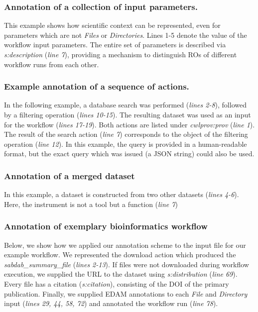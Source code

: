 

\subsubsection{Annotation of a collection of input parameters.} \label{sec:annot_actions}
This example shows how scientific context can be represented, even for parameters which are not \emph{Files} or \emph{Directories}. Lines 1-5 denote the value of the workflow input parameters. The entire set of parameters is described via \emph{s:description} (\emph{line 7}), providing a mechanism to distinguish ROs of different workflow runs from each other.



\subsubsection{Example annotation of a sequence of actions.} 

In the following example, a database search was performed (\emph{lines 2-8}), followed by a filtering operation (\emph{lines 10-15}). The resulting dataset was used as an input for the workflow (\emph{lines 17-19}). Both actions are listed under \emph{cwlprov:prov} (\emph{line 1}). The result of the search action (\emph{line 7}) corresponds to the object of the filtering operation (\emph{line 12}). In this example, the query is provided in a human-readable format, but the exact query which was issued (a JSON string) could also be used.



\subsubsection{Annotation of a merged dataset}

In this example, a dataset is constructed from two other datasets (\emph{lines 4-6}).
Here, the instrument is not a tool but a function (\emph{line 7})



\subsubsection{Annotation of exemplary bioinformatics workflow}
Below, we show how we applied our annotation scheme to the input file for our example workflow. We represented the download action which produced the \emph{sabdab\_summary\_file} (\emph{lines 2-13}). If files were not downloaded during workflow execution, we supplied the URL to the dataset using \emph{s:distribution} (\emph{line 69}). Every file has a citation (\emph{s:citation}), consisting of the DOI of the primary publication. Finally, we supplied EDAM annotations to each \emph{File} and \emph{Directory} input (\emph{lines 29, 44, 58, 72}) and annotated the workflow run (\emph{line 78}). 

